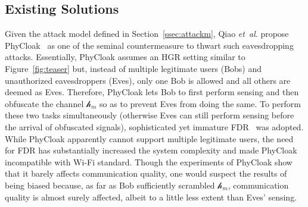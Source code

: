 \documentclass[conference,compsoc]{IEEEtran}
\newcommand{\rev}[1]{{\color{blue}#1}}      %
\newcommand{\rev}[1]{#1}
\begin{document}
\iffalse
	We need to  clarify the fundamental difference between sensing security and (conventional) communication security in the concept of plaintext (i.e., contents to be secured): it is physical for sensing but digital for communications, hence making the known-plaintext attack (KPA) very different. 
	Plaintext for sensing is the physical phenomenon (hand gestures and the incurred channel variations in our context); such plaintext raises the bar for attacker, as they have to be physical yet digital defence may thwart physical attacks. Also, conventional security analysis may not be applicable to cases with both plaintext and attacks being physical. For example, launching KPA is possible but requires the collusion of at least two Eves: one performs hand gestures (and labels them) while another observing the scrambled CSIs. Nonetheless, such an obvious attack would totally expose Eves and hence go against their stealthiness (a realistic requirement specified in our attack model). This is in stark contrast to compromising the security of Wi-Fi data traffics that doesn’t require such an obvious presence of Eves.
\fi

%

\vspace{-.5ex}
\subsection{Existing Solutions} \label{ssec:survey}
\vspace{-1ex}
%
Given the attack model defined in Section~\ref{ssec:attackm}, Qiao \textit{et~al}. propose PhyCloak~\cite{PhyCloak-NSDI16} as one of the seminal countermeasure to thwart such eavesdropping attacks. Essentially, PhyCloak assumes an HGR setting similar to Figure~\ref{fig:teaser} but, instead of multiple legitimate users (Bobs) and unauthorized eavesdroppers (Eves), only one Bob is allowed and all others are deemed as Eves. Therefore, PhyCloak lets Bob to first perform sensing and then obfuscate the channel \rev{$\mathcal{h}_{m}$} so as to prevent Eves from doing the same. To perform these two tasks simultaneously (otherwise Eves can still perform sensing before the arrival of obfuscated signals), sophisticated yet immature FDR~\cite{FDR-SIGCOMM13} was adopted. While PhyCloak apparently cannot support multiple legitimate users, the need for FDR has substantially increased the system complexity and made PhyCloak incompatible with Wi-Fi standard. Though the experiments of PhyCloak show that it barely affects communication quality, one would suspect the results of being biased because, as far as Bob sufficiently scrambled \rev{$\mathcal{h}_{m}$}, communication quality is almost surely affected, albeit to a little less extent than Eves' sensing.
\end{document}
